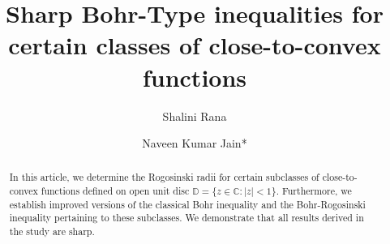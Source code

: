 \documentclass[12pt,a4paper,reqno]{amsart}
\title[Sharp Bohr-Type  inequalities]{Sharp Bohr-Type  inequalities for certain classes of close-to-convex  functions}
\author[S. Rana]{Shalini Rana}
\author[N.K. Jain]{Naveen Kumar Jain*}
\date{}
\theoremstyle{definition}
\theoremstyle{plain}
\numberwithin{equation}{section}
\begin{document}

\begin{abstract}
In this article, we determine the Rogosinski radii for certain subclasses of close-to-convex functions defined on open unit disc $\mathbb{D}= \{z \in \mathbb{C}: |z| < 1\}$. Furthermore, we establish improved versions of the classical Bohr inequality and the Bohr-Rogosinski inequality pertaining to these subclasses. We demonstrate that all results derived in the study are sharp.
\end{abstract}
\maketitle
\end{document}
